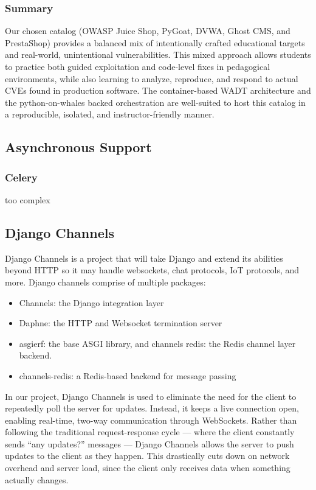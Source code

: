 \documentclass[12pt]{article}
\begin{document}
\subsubsection{Summary}
Our chosen catalog (OWASP Juice Shop, PyGoat, DVWA, Ghost CMS, and PrestaShop) provides a balanced mix of intentionally crafted educational targets and real-world, unintentional vulnerabilities. This mixed approach allows students to practice both guided exploitation and code-level fixes in pedagogical environments, while also learning to analyze, reproduce, and respond to actual CVEs found in production software. The container-based WADT architecture and the python-on-whales backed orchestration are well-suited to host this catalog in a reproducible, isolated, and instructor-friendly manner.

\subsection{Asynchronous Support}

\subsubsection{Celery}
too complex

\subsection{Django Channels}
Django Channels is a project that will take Django and extend its abilities beyond HTTP so it may handle
websockets, chat protocols, IoT protocols, and more. 
Django channels comprise of multiple packages:
\begin{itemize}
    \item Channels: the Django integration layer
    \item Daphne: the HTTP and Websocket termination server
    \item asgierf: the base ASGI library, and channels redis: the Redis channel layer backend.
    \item channels-redis: a Redis-based backend for message passing
\end{itemize} 

In our project, Django Channels is used to eliminate the need for the client to repeatedly poll the server for updates.
Instead, it keeps a live connection open, enabling real-time, two-way communication through WebSockets.
Rather than following the traditional request-response cycle — where the client constantly sends “any updates?” messages —
Django Channels allows the server to push updates to the client as they happen.
This drastically cuts down on network overhead and server load, since the client only receives data when something actually changes.
\end{document}
